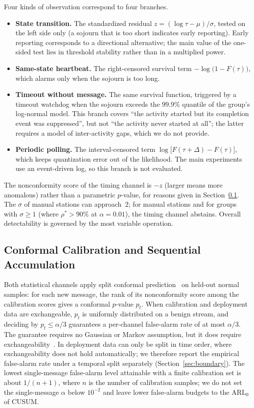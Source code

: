 \documentclass[manuscript,screen,review]{acmart}
\begin{document}
Four kinds of observation correspond to four branches.
\begin{itemize}[leftmargin=1.4em,itemsep=2pt]
\item \textbf{State transition.} The standardized residual $z=(\log\tau-\mu)/\sigma$, tested on the left side only (a sojourn that is too short indicates early reporting). Early reporting corresponds to a directional alternative; the main value of the one-sided test lies in threshold stability rather than in a multiplied power.
\item \textbf{Same-state heartbeat.} The right-censored survival term $-\log\bigl(1-F(\tau)\bigr)$, which alarms only when the sojourn is too long.
\item \textbf{Timeout without message.} The same survival function, triggered by a timeout watchdog when the sojourn exceeds the $99.9\%$ quantile of the group's log-normal model. This branch covers ``the activity started but its completion event was suppressed'', but not ``the activity never started at all''; the latter requires a model of inter-activity gaps, which we do not provide.
\item \textbf{Periodic polling.} The interval-censored term $\log\bigl[F(\tau+\Delta)-F(\tau)\bigr]$, which keeps quantization error out of the likelihood. The main experiments use an event-driven log, so this branch is not evaluated.
\end{itemize}
The nonconformity score of the timing channel is $-z$ (larger means more anomalous) rather than a parametric $p$-value, for reasons given in Section~\ref{sec:conformal}. The $\sigma$ of manual stations can approach~$2$; for manual stations and for groups with $\sigma\ge1$ (where $\rho^*>90\%$ at $\alpha=0.01$), the timing channel abstains. Overall detectability is governed by the most variable operation.

\subsection{Conformal Calibration and Sequential Accumulation}
\label{sec:conformal}

Both statistical channels apply split conformal prediction~\cite{shafer2008conformal,angelopoulos2023conformal} on held-out normal samples: for each new message, the rank of its nonconformity score among the calibration scores gives a conformal $p$-value $p_t$. When calibration and deployment data are exchangeable, $p_t$ is uniformly distributed on a benign stream, and deciding by $p_t\le\alpha/3$ guarantees a per-channel false-alarm rate of at most $\alpha/3$. The guarantee requires no Gaussian or Markov assumption, but it does require exchangeability~\cite{barber2023exchangeability}. In deployment data can only be split in time order, where exchangeability does not hold automatically; we therefore report the empirical false-alarm rate under a temporal split separately (Section~\ref{sec:boundary}). The lowest single-message false-alarm level attainable with a finite calibration set is about $1/(n+1)$, where $n$ is the number of calibration samples; we do not set the single-message $\alpha$ below $10^{-2}$ and leave lower false-alarm budgets to the $\mathrm{ARL}_0$ of {CUSUM}.
\end{document}

